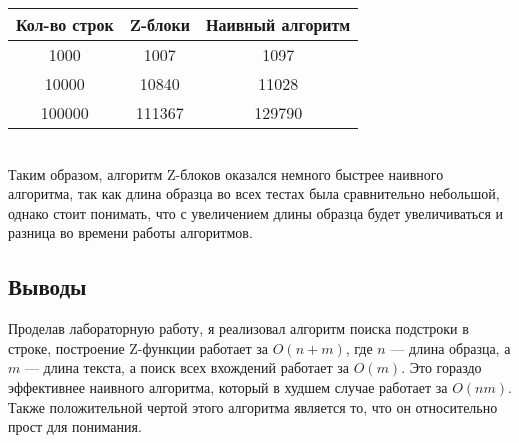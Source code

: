 \documentclass[12pt]{article}
\begin{document}
    \begin{tabular}{ | c | c | c | }
        \hline
            Кол-во строк & Z-блоки & Наивный алгоритм \\ \hline
            1000 & 1007 & 1097 \\
            10000 & 10840 & 11028 \\
            100000 & 111367 & 129790 \\
        \hline
    \end{tabular}
    \\Таким образом, алгоритм Z-блоков оказался немного быстрее наивного 
    алгоритма, так как длина образца во всех тестах была сравнительно 
    небольшой, однако стоит понимать, что с увеличением длины образца 
    будет увеличиваться и разница во времени работы алгоритмов.

    \subsection*{Выводы}
    Проделав лабораторную работу, я реализовал алгоритм поиска подстроки в 
    строке, построение Z-функции работает за $O(n + m)$, где $n$ — длина 
    образца, а $m$ — длина текста, а поиск всех вхождений работает за $O(m)$. 
    Это гораздо эффективнее наивного алгоритма, который в худшем случае 
    работает за $O(nm)$. Также положительной чертой этого алгоритма является 
    то, что он относительно прост для понимания.
\end{document}
